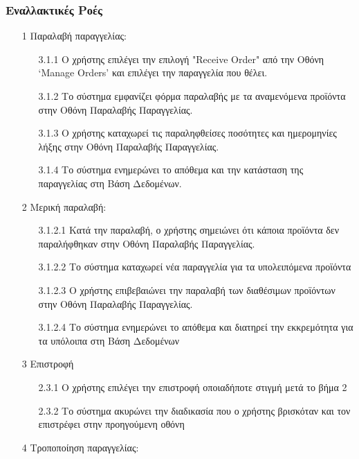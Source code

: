 \documentclass[12pt,a4paper,twoside]{book}
\begin{document}
\subsubsection{Εναλλακτικές Ροές}
\begin{enumerate}
  \item[1 ] Παραλαβή παραγγελίας:
        \begin{enumerate}
          \item[3.1.1 ] Ο χρήστης επιλέγει την επιλογή "Receive Order" από την Οθόνη `Manage Orders' και επιλέγει την παραγγελία που θέλει. %
          \item[3.1.2 ] Το σύστημα εμφανίζει φόρμα παραλαβής με τα αναμενόμενα προϊόντα στην Οθόνη Παραλαβής Παραγγελίας.
          \item[3.1.3 ] Ο χρήστης καταχωρεί τις παραληφθείσες ποσότητες και ημερομηνίες λήξης στην Οθόνη Παραλαβής Παραγγελίας.
          \item[3.1.4 ] Το σύστημα ενημερώνει το απόθεμα και την κατάσταση της παραγγελίας στη Βάση Δεδομένων. %
        \end{enumerate}
  \item[2 ] Μερική παραλαβή:
        \begin{enumerate}
          \item[3.1.2.1 ] Κατά την παραλαβή, ο χρήστης σημειώνει ότι κάποια προϊόντα δεν παραλήφθηκαν στην Οθόνη Παραλαβής Παραγγελίας. %
          \item[3.1.2.2 ] Το σύστημα καταχωρεί νέα παραγγελία για τα υπολειπόμενα προϊόντα %
          \item[3.1.2.3 ] Ο χρήστης επιβεβαιώνει την παραλαβή των διαθέσιμων προϊόντων στην Οθόνη Παραλαβής Παραγγελίας. %
          \item[3.1.2.4 ] Το σύστημα ενημερώνει το απόθεμα και διατηρεί την εκκρεμότητα για τα υπόλοιπα στη Βάση Δεδομένων %
        \end{enumerate}
  \item[3 ] Επιστροφή
        \begin{enumerate}
          \item[2.3.1 ] Ο χρήστης επιλέγει την επιστροφή οποιαδήποτε στιγμή μετά το βήμα 2 %
          \item[2.3.2 ] Το σύστημα ακυρώνει την διαδικασία που ο χρήστης βρισκόταν και τον επιστρέφει στην προηγούμενη οθόνη %
        \end{enumerate}
  \item[4 ] Τροποποίηση παραγγελίας:

\end{enumerate}
\end{document}
